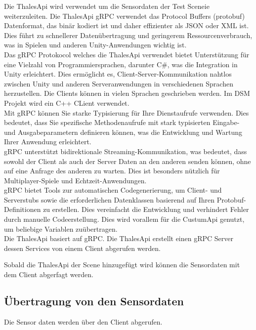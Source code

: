 Die ThalesApi wird verwendet um die Sensordaten der Test Sceneie weiterzuleiten.
Die ThalesApi gRPC verwendet das Protocol Buffers (protobuf) Datenformat, das binär kodiert ist und daher effizienter als JSON oder XML ist. Dies führt zu schnellerer Datenübertragung und geringerem Ressourcenverbrauch, was in Spielen und anderen Unity-Anwendungen wichtig ist.\\
Das gRPC Protokocol welches die ThalesApi verwendet bietet Unterstützung für eine Vielzahl von Programmiersprachen, darunter C\#, was die Integration in Unity erleichtert. Dies ermöglicht es, Client-Server-Kommunikation nahtlos zwischen Unity und anderen Serveranwendungen in verschiedenen Sprachen herzustellen. Die Clients können in vielen Sprachen geschrieben werden. Im DSM Projekt wird ein C++ CLient verwendet.\\
Mit gRPC können Sie starke Typisierung für Ihre Dienstaufrufe verwenden. Dies bedeutet, dass Sie spezifische Methodenaufrufe mit stark typisierten Eingabe- und Ausgabeparametern definieren können, was die Entwicklung und Wartung Ihrer Anwendung erleichtert.\\
gRPC unterstützt bidirektionale Streaming-Kommunikation, was bedeutet, dass sowohl der Client als auch der Server Daten an den anderen senden können, ohne auf eine Anfrage des anderen zu warten. Dies ist besonders nützlich für Multiplayer-Spiele und Echtzeit-Anwendungen.\\
gRPC bietet Tools zur automatischen Codegenerierung, um Client- und Serverstubs sowie die erforderlichen Datenklassen basierend auf Ihren Protobuf-Definitionen zu erstellen. Dies vereinfacht die Entwicklung und verhindert Fehler durch manuelle Codeerstellung. Dies wird vorallem für die CustumApi genutzt, um beliebige Variablen zuübertragen.\\
Die ThalesApi basiert auf gRPC. Die ThalesApi erstellt einen gRPC Server dessen Services von einem Client abgerufen werden.  

Sobald die ThalesApi der Scene hinzugefügt wird können die Sensordaten mit dem Client abgerfagt werden.


\subsection{Übertragung von den Sensordaten}
Die Sensor daten werden über den Client abgerufen.

